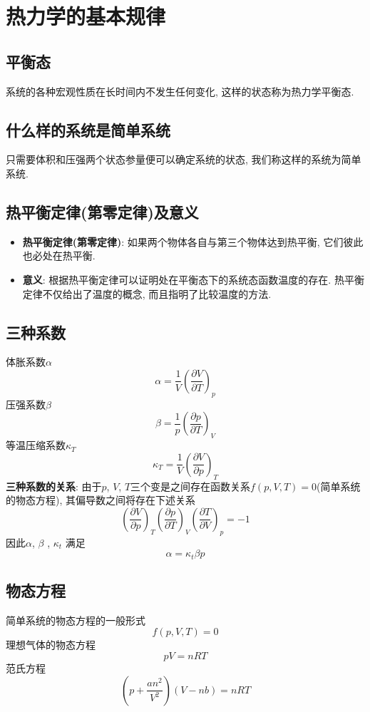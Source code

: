 \section{热力学的基本规律}
\subsection{平衡态}
系统的各种宏观性质在长时间内不发生任何变化, 这样的状态称为热力学平衡态.

\subsection{什么样的系统是简单系统}
只需要体积和压强两个状态参量便可以确定系统的状态, 我们称这样的系统为简单系统.

\subsection{热平衡定律(第零定律)及意义}
\begin{itemize}
    \item \textbf{热平衡定律(第零定律)}: 如果两个物体各自与第三个物体达到热平衡, 它们彼此也必处在热平衡.
    \item \textbf{意义}: 根据热平衡定律可以证明处在平衡态下的系统态函数温度的存在. 热平衡定律不仅给出了温度的概念, 而且指明了比较温度的方法.
\end{itemize}

\subsection{三种系数}
体胀系数$\alpha$
$$
    \alpha=\frac{1}{V}\left(\frac{\partial V}{\partial T}\right)_p
$$
压强系数$\beta$
$$
    \beta=\frac{1}{p}\left(\frac{\partial p}{\partial T}\right)_V
$$
等温压缩系数$\kappa_T$
$$
    \kappa_T=\frac{1}{V}\left(\frac{\partial V}{\partial p}\right)_T
$$
\textbf{三种系数的关系}: 由于$p$, $V$, $T$三个变是之间存在函数关系$f(p,V,T)=0$(简单系统的物态方程), 其偏导数之间将存在下述关系
$$
    \left(\frac{\partial V}{\partial p}\right)_T\left(\frac{\partial
        p}{\partial T}\right)_V\left(\frac{\partial T}{\partial V}\right)_p=-1
$$
因此$\alpha$, $\beta$ , $\kappa_t$ 满足
$$
    \alpha=\kappa_t\beta p
$$

\subsection{物态方程}
简单系统的物态方程的一般形式
$$
    f(p,V,T)=0
$$
理想气体的物态方程
$$
    pV=nRT
$$
范氏方程
$$
    \left(p+\frac{an^2}{V^2}\right)(V-nb)=nRT
$$
